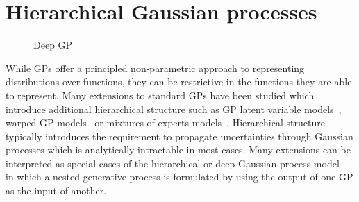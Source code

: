 \section{Hierarchical Gaussian processes}
\label{toc:dgp}
\begin{figure}[t]
    \centering
    \caption{
        Deep GP
        \label{fig:dgp:graphical_model}
    }
\end{figure}
While GPs offer a principled non-parametric approach to representing distributions over functions, they can be restrictive in the functions they are able to represent.
Many extensions to standard GPs have been studied which introduce additional hierarchical structure such as GP latent variable models~\parencite{titsias_bayesian_2010,damianou_variational_2014}, warped GP models~\parencite{snelson_warped_2004,lazaro-gredilla_bayesian_2012} or mixtures of experts models~\parencite{tresp_mixtures_2001,rasmussen_infinite_2002,lazaro-gredilla_overlapping_2012}.
Hierarchical structure typically introduces the requirement to propagate uncertainties through Gaussian processes which is analytically intractable in most cases.
Many extensions can be interpreted as special cases of the hierarchical or deep Gaussian process model~\parencite{lawrence_hierarchical_2007,damianou_deep_2013} in which a nested generative process is formulated by using the output of one GP as the input of another.

